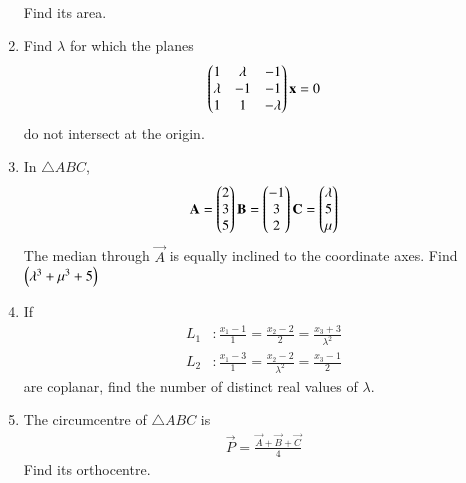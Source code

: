 \documentclass[journal,12pt,twocolumn]{IEEEtran}
\begin{document}
\begin{enumerate}[label=\arabic*.]
\begin{align}
\end{align}
%
Find its area.
\item Find $\lambda$ for which the planes
\begin{align}
\begin{pmatrix}1 & \lambda & -1
\\
\lambda & -1 & -1
\\
1 & 1 & -\lambda
\end{pmatrix}
\mathbf{x}
=0
\end{align}
%
do not intersect at the origin.
%
\item In $\triangle ABC$,
\begin{align}
\mathbf{A}=\begin{pmatrix}2 \\ 3 \\ 5\end{pmatrix}
\mathbf{B}=\begin{pmatrix}-1 \\ 3 \\ 2\end{pmatrix}
\mathbf{C}=\begin{pmatrix}\lambda \\ 5 \\ \mu\end{pmatrix}
\end{align}
%
The median through $\vec{A}$ is equally inclined to the coordinate axes.  Find $\left(\lambda^3+\mu^3+5\right)$
\item If
\begin{align}
L_1&:\frac{x_1-1}{1}=
\frac{x_2-2}{2} = 
\frac{x_3+3}{\lambda^2}
\\
L_2&:\frac{x_1-3}{1}=
\frac{x_2-2}{\lambda^2} = 
\frac{x_3-1}{2}
\end{align}
%
are coplanar, find the number of distinct real values of $\lambda$.
%
\item The circumcentre of $\triangle ABC$ is 
\begin{align}
\vec{P}=\frac{\vec{A}+\vec{B}+\vec{C}}{4}
\end{align}
%
Find its orthocentre.
\end{enumerate}
\end{document}
